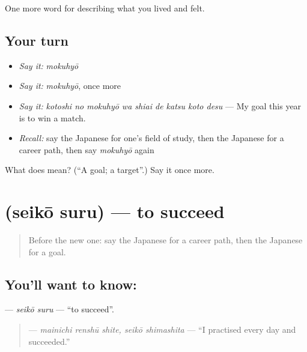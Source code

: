 \begin{grammarlens}[title={What you've built}]
One more word for describing what you lived and felt.
\end{grammarlens}

\subsection*{Your turn}
\begin{itemize}
\raggedright
  \item \emph{Say it:} \emph{mokuhyō}
  \item \emph{Say it:} \emph{mokuhyō}, once more
  \item \emph{Say it:} \emph{kotoshi no mokuhyō wa shiai de katsu koto desu} — My goal this year is to win a match.
  \item \emph{Recall:} say the Japanese for one's field of study, then the Japanese for a career path, then say \emph{mokuhyō} again
\end{itemize}

\begin{tcolorbox}[breakable,colback=teal!4,colframe=teal!35!black,title={Before you move on}]
What does  mean? (\textquotedblleft{}A goal; a target\textquotedblright{}.) Say it once more.
\end{tcolorbox}
\section[\texorpdfstring{\ja{せいこうする} (seikō suru)}{せいこうする (seikō suru)}]{ (seikō suru) — to succeed}

\label{lesson:JA-C460-seikou-suru}



\begin{quote}
Before the new one: say the Japanese for a career path, then the Japanese for a goal.
\end{quote}

\subsection*{You'll want to know: }
\textbf{} — \emph{seikō suru} — \textquotedblleft{}to succeed\textquotedblright{}.

\begin{quote}
\textbf{ } — \emph{mainichi renshū shite, seikō shimashita} — \textquotedblleft{}I practised every day and succeeded.\textquotedblright{}
\end{quote}

